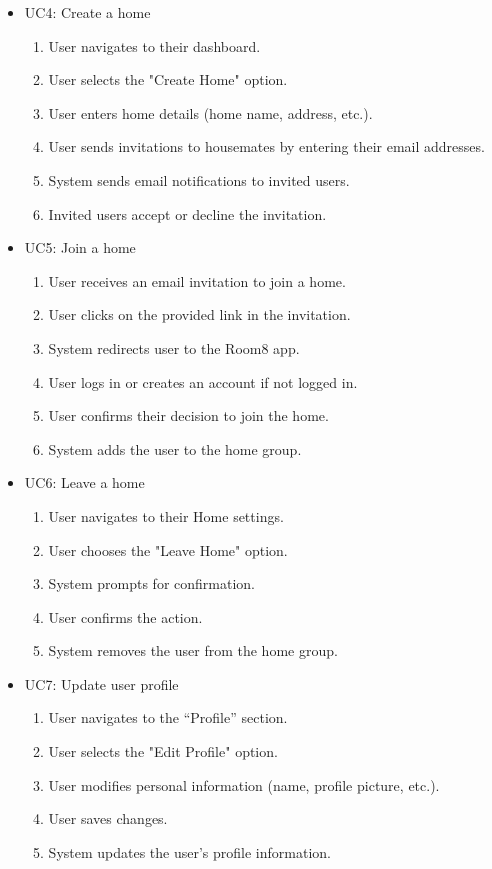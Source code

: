 \documentclass{scrreprt}
\theoremstyle{definition}
\begin{document}
\begin{itemize}
    \item UC4: Create a home
    \begin{enumerate}
        \item User navigates to their dashboard.
        \item User selects the "Create Home" option.
        \item User enters home details (home name, address, etc.).
        \item User sends invitations to housemates by entering their email addresses.
        \item System sends email notifications to invited users.
        \item Invited users accept or decline the invitation.
    \end{enumerate}
    
    \item UC5: Join a home
    \begin{enumerate}
        \item User receives an email invitation to join a home.
        \item User clicks on the provided link in the invitation.
        \item System redirects user to the Room8 app.
        \item User logs in or creates an account if not logged in.
        \item User confirms their decision to join the home.
        \item System adds the user to the home group.
    \end{enumerate}
    
    \item UC6: Leave a home
    \begin{enumerate}
        \item User navigates to their Home settings.
        \item User chooses the "Leave Home" option.
        \item System prompts for confirmation.
        \item User confirms the action.
        \item System removes the user from the home group.
    \end{enumerate}
    
    \item UC7: Update user profile
    \begin{enumerate}
        \item User navigates to the “Profile” section.
        \item User selects the "Edit Profile" option.
        \item User modifies personal information (name, profile picture, etc.).
        \item User saves changes.
        \item System updates the user’s profile information.
    \end{enumerate}
    

\end{itemize}
\end{document}

